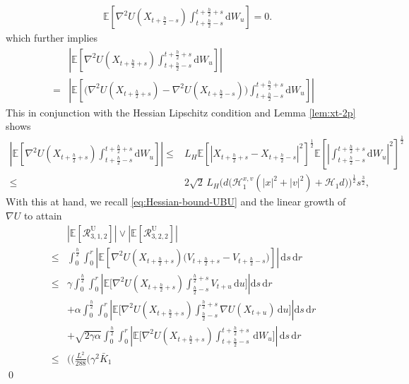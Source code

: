 \documentclass[12pt]{article}
\newenvironment{redtext}
  {\color{black}\ignorespaces}
  {\ignorespacesafterend}
\numberwithin{equation}{section}
\renewenvironment{proof}%
  {\begin{trivlist}%
   \item[]\ignorespaces}%
  {\qed\end{trivlist}}
\newcommand{\E}{\mathbb{E}}
\newcommand{\dd}{\mathrm{d}}
\begin{document}
\begin{redtext}
\begin{proof}
\begin{align}
&\E
\left[
\nabla^2U(X_{t+\frac h2-s})
\int_{t+\frac h2-s}^{t+\frac h2+s}
\dd W_u
\right]
=
0.
\label{eq:R3-Brownian-zero}
\end{align}
which further implies
\begin{align}
&
\left|
\E
\left[
\nabla^2U(X_{t+\frac h2+s})
\int_{t+\frac h2-s}^{t+\frac h2+s}
\dd W_u
\right]
\right|
\nonumber
\\ 
=  &
\left|
\E
\left[
\Big(
\nabla^2U(X_{t+\frac h2+s})
-
\nabla^2U(X_{t+\frac h2-s})
\Big)
\int_{t+\frac h2-s}^{t+\frac h2+s}
\dd W_u
\right]
\right|
\end{align}
This in conjunction with the Hessian Lipschitz condition and Lemma \ref{lem:xt-2p} shows 
\begin{align}
\left|
\E
\left[
\nabla^2U(X_{t+\frac h2+s})
\int_{t+\frac h2-s}^{t+\frac h2+s}
\dd W_u
\right]
\right|
\leq&
L_H
\E
\left[
\left|
X_{t+\frac h2+s}
-
X_{t+\frac h2-s}
\right|^2
\right]^{\frac12}
\E
\left[
\left|
\int_{t+\frac h2-s}^{t+\frac h2+s}
\dd W_u
\right|^2
\right]^{\frac12}
\nonumber\\
\leq&
2\sqrt{2}\,L_H 
\Big(d
\bigl(
\mathscr H_1^{x,v}
(
|x|^2+|v|^2
)
+
\mathscr H_1
d
\bigr)
\Big)^{\frac{1}{2}}s^{\frac{3}{2}},
\label{eq:R3-Brownian-estimate}
\end{align}
With this at hand, we recall \eqref{eq:Hessian-bound-UBU} and the linear growth of $\nabla U$ to attain
\begin{align}
& \left|
\E
\left[
\mathcal R^{\mathrm U}_{3,1,2}
\right]
\right|
\vee
\left|
\E
\left[
\mathcal R^{\mathrm U}_{3,2,2}
\right]
\right|
\nonumber
\\
\leq   &
\int_0^{\frac h2}\int_0^r
\left|
\E 
\left[
\nabla^2U(X_{t+\frac h2+s})
\Big(
V_{t+\frac h2+s}
-
V_{t+\frac h2-s}
\Big)
\right]
\right|
\,\dd s\,\dd r
\nonumber
\\ 
\leq   &
\gamma
\int_0^{\frac h2}\int_0^r
\left|
\E 
\bigg[
\nabla^2U(X_{t+\frac h2+s})
\int_{\frac{h}{2}-s}^{\frac{h}{2}+s}
V_{t+u}\,\dd u
\bigg]
\right|
\dd s \, \dd r
\nonumber\\
&+
\alpha
\int_0^{\frac h2}\int_0^r
\left|
\E 
\bigg[
\nabla^2U(X_{t+\frac h2+s})
\int_{\frac{h}{2}-s}^{\frac{h}{2}+s}
\nabla U(X_{t+u})\,\dd u
\bigg]
\right|
\dd s \, \dd r
\nonumber
\\   &
+
\sqrt{2\gamma\alpha}
\int_0^{\frac h2}\int_0^r
\left|
\E 
\bigg[
\nabla^2U(X_{t+\frac h2+s})
\int_{t+\frac{h}{2}-s}^{t+\frac{h}{2}+s} \, \dd W_u
\bigg]
\right|
\,\dd s\,\dd r
\nonumber
\\ 
\leq  &
\Big(
\big(
\tfrac{L^2}{288}
(
\gamma^2\bar K_1

\end{align}
\end{proof}
\end{redtext}
\end{document}
